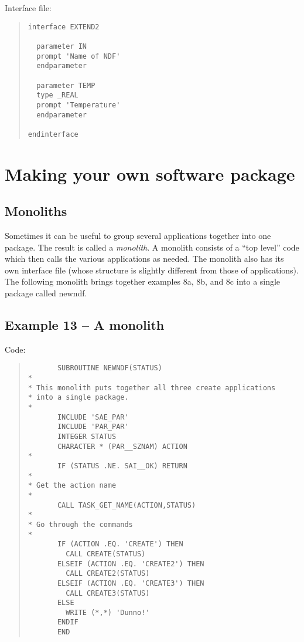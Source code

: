 Interface file:

\begin{quote}
{\small
\begin{verbatim}
interface EXTEND2

  parameter IN
  prompt 'Name of NDF'
  endparameter

  parameter TEMP
  type _REAL
  prompt 'Temperature'
  endparameter

endinterface
\end{verbatim}
}
\end{quote}

\section{Making your own software package}

\subsection{Monoliths}

Sometimes it can be useful to group several applications together into 
one package. The result is called a {\em monolith}. A monolith consists 
of a ``top level'' code which then calls the various applications as needed.
The monolith also has its own interface file (whose structure is slightly 
different from those of applications). The following monolith brings 
together examples 8a, 8b, and 8c into a single package called {\sf newndf}.

\subsection{Example 13 -- A monolith}
 
Code:

\begin{quote}
{\small
\begin{verbatim}
       SUBROUTINE NEWNDF(STATUS)
*
* This monolith puts together all three create applications
* into a single package.
*
       INCLUDE 'SAE_PAR'
       INCLUDE 'PAR_PAR'
       INTEGER STATUS
       CHARACTER * (PAR__SZNAM) ACTION
*     
       IF (STATUS .NE. SAI__OK) RETURN
*
* Get the action name
*
       CALL TASK_GET_NAME(ACTION,STATUS)
*
* Go through the commands
*
       IF (ACTION .EQ. 'CREATE') THEN
         CALL CREATE(STATUS)
       ELSEIF (ACTION .EQ. 'CREATE2') THEN
         CALL CREATE2(STATUS)
       ELSEIF (ACTION .EQ. 'CREATE3') THEN
         CALL CREATE3(STATUS)
       ELSE
         WRITE (*,*) 'Dunno!'
       ENDIF
       END
\end{verbatim}
}
\end{quote}

